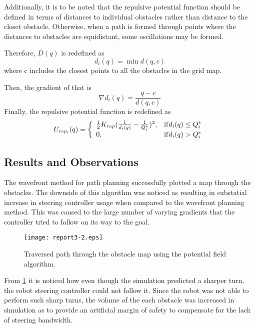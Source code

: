 \documentclass{article}
\newcommand{\tmop}[1]{\ensuremath{\operatorname{#1}}}
\begin{document}
Additionally, it is to be noted that the repulsive potential function should
be defined in terms of distances to individual obstacles rather than distance
to the closet obstacle. Otherwise, when a path is formed through points where
the distances to obstacles are equidistant, some oscillations may be formed.

Therefore, $D (q)$ is redefined as
\begin{equation}
  d_i (q) = \min d (q, c)
\end{equation}
where c includes the closest points to all the obstacles in the grid map.

Then, the gradient of that is
\begin{equation}
  \nabla d_i (q) = \frac{q - c}{d (q, c)}
\end{equation}
Finally, the repulsive potential function is redefined as
\begin{equation}
  U_{rep_i} (q) = \left\{ \begin{array}{ll}
    \frac{1}{2} K_{rep}  ( \frac{1}{d_i (q)} - \frac{1}{Q_i^{\ast}})^2, &
    \text{\tmop{if}} d_i (q) \leq Q_i^{\ast}\\
    0, & \text{\tmop{if}} d_i (q) > Q_i^{\ast}
  \end{array} \right.
\end{equation}

\subsection{Results and Observations}

The wavefront method for path planning successfully plotted a map through the
obstacles. The downside of this algorithm was noticed as resulting in
substatial increase in steering controller usage when compared to the
wavefront planning method. This was caused to the large number of varying
gradients that the controller tried to follow on its way to the goal.

\begin{figure}[h]
  \texttt{[image: report3-2.eps]} \label{potFieldMap}
  \caption{Traversed path through the obstacle map using the potential field
  algorithm.}
\end{figure}

From \ref{potFieldMap} it is noticed how even though the simulation predicted
a sharper turn, the robot steering controller could not follow it. Since the
robot was not able to perform such sharp turns, the volume of the each
obstacle was increased in simulation as to provide an artificial margin of
safety to compensate for the lack of steering bandwidth.
\end{document}
